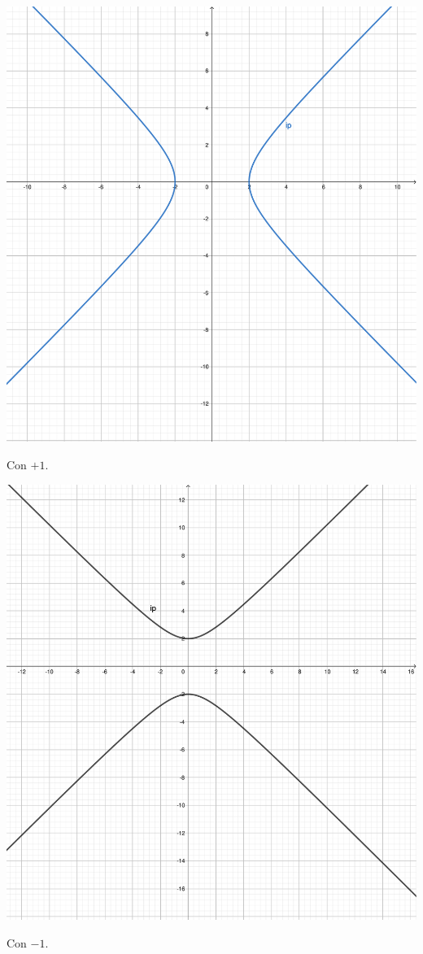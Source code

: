 \documentclass[a4paper]{article}
\begin{document}
	\begin{minipage}{.6\textwidth}
		\centering
		\includegraphics[width=\textwidth]{img/iperbole_ascisse.pdf}
		
		\noindent
		Con $+1$.
	\end{minipage}
	\begin{minipage}{.4\textwidth}
		\centering
		\includegraphics[width=.9\textwidth]{img/iperbole_ordinate.pdf}
		
		\noindent
		Con $-1$.
	\end{minipage}\newline
\end{document}
